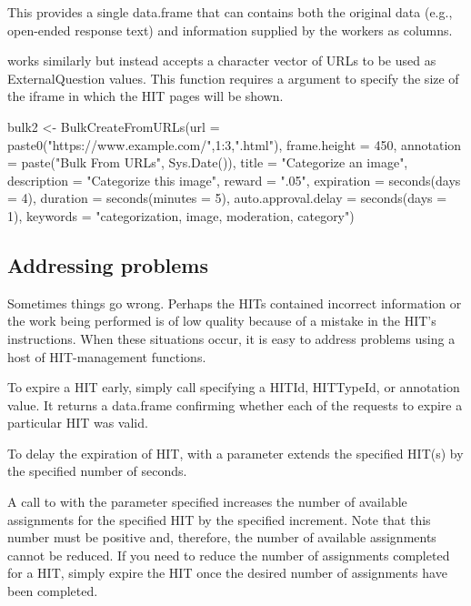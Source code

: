 \noindent This provides a single data.frame that can contains both the original data (e.g., open-ended response text) and information supplied by the workers as columns.

 works similarly but instead accepts a character vector of URLs to be used as ExternalQuestion values. This function requires a  argument to specify the size of the iframe in which the HIT pages will be shown.


\begin{example}
bulk2 <- 
BulkCreateFromURLs(url = paste0("https://www.example.com/",1:3,".html"),
                   frame.height = 450,
                   annotation = paste("Bulk From URLs", Sys.Date()),
                   title = "Categorize an image",
                   description = "Categorize this image",
                   reward = ".05",
                   expiration = seconds(days = 4),
                   duration = seconds(minutes = 5),
                   auto.approval.delay = seconds(days = 1),
                   keywords = "categorization, image, moderation, category")
\end{example}



\subsection{Addressing problems}

Sometimes things go wrong. Perhaps the HITs contained incorrect information or the work being performed is of low quality because of a mistake in the HIT's instructions. When these situations occur, it is easy to address problems using a host of HIT-management functions. 

To expire a HIT early, simply call  specifying a HITId, HITTypeId, or annotation value. It returns a data.frame confirming whether each of the requests to expire a particular HIT was valid.

To delay the expiration of HIT,  with a  parameter extends the specified HIT(s) by the specified number of seconds. 

A call to  with the  parameter specified increases the number of available assignments for the specified HIT by the specified increment. Note that this number must be positive and, therefore, the number of available assignments cannot be reduced. If you need to reduce the number of assignments completed for a HIT, simply expire the HIT once the desired number of assignments have been completed.

